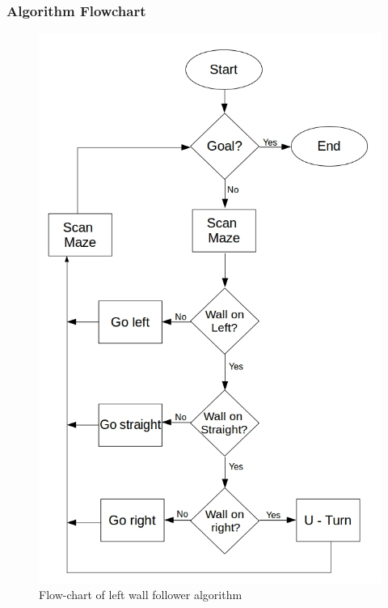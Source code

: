 \subsubsection{Algorithm Flowchart}
\begin{figure}[h]
\center
\includegraphics[scale=0.5]{flowchartnew.jpg}  
\caption{Flow-chart of left wall follower algorithm}
\end{figure}
